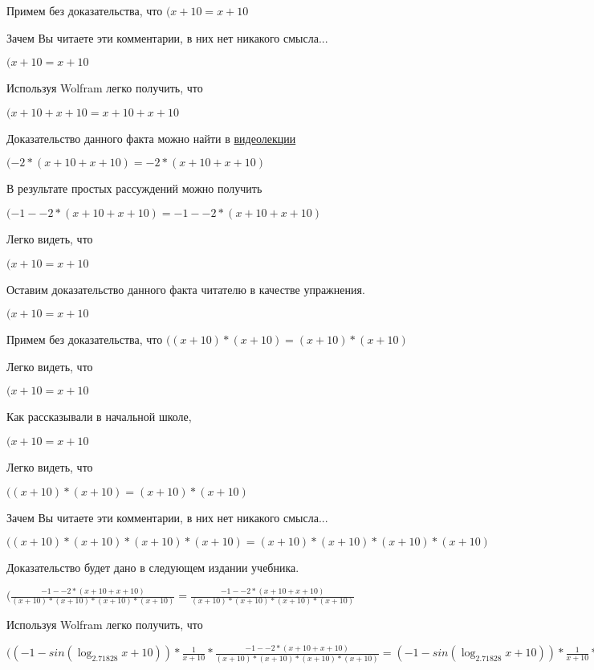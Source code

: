 \documentclass[12pt,a4paper,fleqn]{article}
\theoremstyle{definition}
\begin{document}
Примем без доказательства, что
$( x  +  10  =  x  +  10 $

Зачем Вы читаете эти комментарии, в них нет никакого смысла...

$( x  +  10  =  x  +  10 $

Используя Wolfram легко получить, что

$( x  +  10  +  x  +  10  =  x  +  10  +  x  +  10 $

Доказательство данного факта можно найти в \href{https://www.youtube.com/watch?v=dQw4w9WgXcQ}{видеолекции}

$( -2  * ( x  +  10  +  x  +  10 ) =  -2  * ( x  +  10  +  x  +  10 )$

В результате простых рассуждений можно получить

$( -1  -  -2  * ( x  +  10  +  x  +  10 ) =  -1  -  -2  * ( x  +  10  +  x  +  10 )$

Легко видеть, что

$( x  +  10  =  x  +  10 $

Оставим доказательство данного факта читателю в качестве упражнения.

$( x  +  10  =  x  +  10 $

Примем без доказательства, что
$(( x  +  10 ) * ( x  +  10 ) = ( x  +  10 ) * ( x  +  10 )$

Легко видеть, что

$( x  +  10  =  x  +  10 $

Как рассказывали в начальной школе,

$( x  +  10  =  x  +  10 $

Легко видеть, что

$(( x  +  10 ) * ( x  +  10 ) = ( x  +  10 ) * ( x  +  10 )$

Зачем Вы читаете эти комментарии, в них нет никакого смысла...

$(( x  +  10 ) * ( x  +  10 ) * ( x  +  10 ) * ( x  +  10 ) = ( x  +  10 ) * ( x  +  10 ) * ( x  +  10 ) * ( x  +  10 )$

Доказательство будет дано в следующем издании учебника.

$(\frac{ -1  -  -2  * ( x  +  10  +  x  +  10 )}{( x  +  10 ) * ( x  +  10 ) * ( x  +  10 ) * ( x  +  10 )}
 = \frac{ -1  -  -2  * ( x  +  10  +  x  +  10 )}{( x  +  10 ) * ( x  +  10 ) * ( x  +  10 ) * ( x  +  10 )}
$

Используя Wolfram легко получить, что

$(( -1  - sin(\log_{ 2.71828 }{ x  +  10 })) * \frac{ 1 }{ x  +  10 }
 * \frac{ -1  -  -2  * ( x  +  10  +  x  +  10 )}{( x  +  10 ) * ( x  +  10 ) * ( x  +  10 ) * ( x  +  10 )}
 = ( -1  - sin(\log_{ 2.71828 }{ x  +  10 })) * \frac{ 1 }{ x  +  10 }
 * \frac{ -1  -  -2  * ( x  +  10  +  x  +  10 )}{( x  +  10 ) * ( x  +  10 ) * ( x  +  10 ) * ( x  +  10 )}
$
\end{document}
